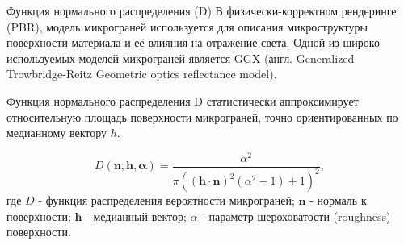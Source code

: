 \documentclass{beamer}
\begin{document}
	\begin{frame}{Функция нормального распределения (D)}{}
		В физически-корректном рендеринге (PBR), модель микрограней используется для описания микроструктуры поверхности материала и её влияния на отражение света. 
		Одной из широко используемых моделей микрограней является GGX (англ. Generalized Trowbridge-Reitz Geometric optics reflectance model).
		
		Функция нормального распределения D статистически аппроксимирует относительную площадь поверхности микрограней, точно ориентированных по медианному вектору $h$.
		
		\[ 
			D(\mathbf{n, h, \alpha}) = \dfrac{\alpha^2}{\pi ((\mathbf{h} \cdot \mathbf{n})^2 (\alpha^2 - 1) + 1)^2} 
			,
		\]
		где
		\(D\) - функция распределения вероятности микрограней;
		\(\mathbf{n}\) - нормаль к поверхности;
		\(\mathbf{h}\) - медианный вектор;
		\(\alpha\) - параметр шероховатости (roughness) поверхности.
		
		
	\end{frame}
\end{document}

